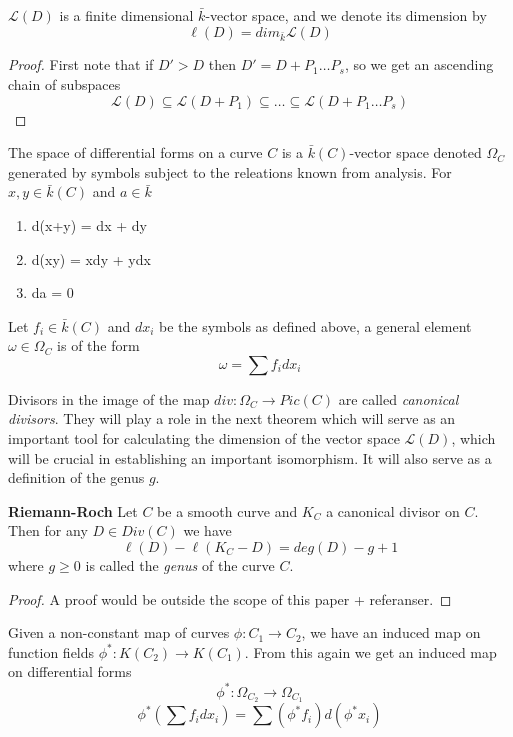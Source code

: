 \begin{prop}
 $\mathscr{L}(D)$ is a finite dimensional $\bar{k}$-vector space, and we denote
its dimension by
$$ \ell(D) = dim_{\bar{k}} \mathscr{L}(D) $$
\end{prop}
\begin{proof}
 First note that if $D' > D$ then $D' = D + P_1 \ldots P_s$, so we get an ascending chain of
subspaces
$$ \mathscr{L}(D) \subseteq \mathscr{L}(D+P_1) \subseteq \ldots \subseteq \mathscr{L}(D+P_1 \ldots P_s) $$

\end{proof}

\begin{mydef}
 The space of differential forms on a curve $C$ is a $\bar{k}(C)$-vector space denoted $\Omega_C$
generated by symbols subject to the releations known from analysis. 
For $x, y \in \bar{k}(C)$ and $a \in \bar{k}$
\begin{enumerate}
  \item d(x+y) = dx + dy
  \item d(xy) = xdy + ydx
  \item da = 0
\end{enumerate}
Let $f_i \in \bar{k}(C)$ and $dx_i$ be the symbols as defined above, a general
element $\omega \in \Omega_C$ is of the form
$$ \omega = \sum f_i dx_i $$
\end{mydef}

Divisors in the image of the map $div: \Omega_C \rightarrow Pic(C)$ are called
\emph{canonical divisors}. They will play a role in the next theorem which will
serve as an important tool for calculating the dimension of the vector space
$\mathscr{L}(D)$, which will be crucial in establishing an important isomorphism.
It will also serve as a definition of the genus $g$.

\begin{thm}
 \textbf{Riemann-Roch}
  Let $C$ be a smooth curve and $K_C$ a canonical divisor on $C$. Then for
any $D \in Div(C)$ we have
$$ \ell(D) - \ell(K_C - D) = deg(D) - g + 1 $$
where $g \geq 0$ is called the \emph{genus} of the curve $C$.
\end{thm}
\begin{proof}
 A proof would be outside the scope of this paper + referanser.
\end{proof}

Given a non-constant map of curves $\phi: C_1 \rightarrow C_2$, we have an induced map
on function fields $\phi^*: K(C_2) \rightarrow K(C_1)$. From this again we get an induced
map on differential forms
$$ \phi^*: \Omega_{C_2} \rightarrow \Omega_{C_1} $$
$$ \phi^*\left(\sum f_i dx_i\right) = \sum (\phi^* f_i) d(\phi^* x_i) $$

